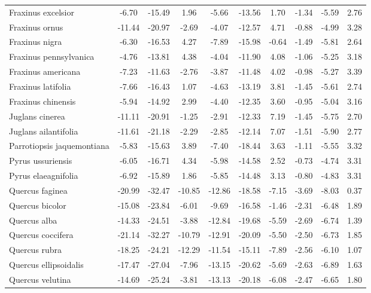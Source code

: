\documentclass[11pt]{article}
\begin{document}
\begin{longtable}{p{1.50in}c{0.32in}c{0.32in}c{0.32in}c{0.32in}c{0.32in}c{0.32in}c{0.2in}c{0.3in}c{0.1in}}
  Fraxinus excelsior & -6.70 & -15.49 & 1.96 & -5.66 & -13.56 & 1.70 & -1.34 & -5.59 & 2.76 \\ 
  Fraxinus ornus & -11.44 & -20.97 & -2.69 & -4.07 & -12.57 & 4.71 & -0.88 & -4.99 & 3.28 \\ 
  Fraxinus nigra & -6.30 & -16.53 & 4.27 & -7.89 & -15.98 & -0.64 & -1.49 & -5.81 & 2.64 \\ 
  Fraxinus pennsylvanica & -4.76 & -13.81 & 4.38 & -4.04 & -11.90 & 4.08 & -1.06 & -5.25 & 3.18 \\ 
  Fraxinus americana & -7.23 & -11.63 & -2.76 & -3.87 & -11.48 & 4.02 & -0.98 & -5.27 & 3.39 \\ 
  Fraxinus latifolia & -7.66 & -16.43 & 1.07 & -4.63 & -13.19 & 3.81 & -1.45 & -5.61 & 2.74 \\ 
  Fraxinus chinensis & -5.94 & -14.92 & 2.99 & -4.40 & -12.35 & 3.60 & -0.95 & -5.04 & 3.16 \\ 
  Juglans cinerea & -11.11 & -20.91 & -1.25 & -2.91 & -12.33 & 7.19 & -1.45 & -5.75 & 2.70 \\ 
  Juglans ailantifolia & -11.61 & -21.18 & -2.29 & -2.85 & -12.14 & 7.07 & -1.51 & -5.90 & 2.77 \\ 
  Parrotiopsis jaquemontiana & -5.83 & -15.63 & 3.89 & -7.40 & -18.44 & 3.63 & -1.11 & -5.55 & 3.32 \\ 
  Pyrus ussuriensis & -6.05 & -16.71 & 4.34 & -5.98 & -14.58 & 2.52 & -0.73 & -4.74 & 3.31 \\ 
  Pyrus elaeagnifolia & -6.92 & -15.89 & 1.86 & -5.85 & -14.48 & 3.13 & -0.80 & -4.83 & 3.31 \\ 
  Quercus faginea & -20.99 & -32.47 & -10.85 & -12.86 & -18.58 & -7.15 & -3.69 & -8.03 & 0.37 \\ 
  Quercus bicolor & -15.08 & -23.84 & -6.01 & -9.69 & -16.58 & -1.46 & -2.31 & -6.48 & 1.89 \\ 
  Quercus alba & -14.33 & -24.51 & -3.88 & -12.84 & -19.68 & -5.59 & -2.69 & -6.74 & 1.39 \\ 
  Quercus coccifera & -21.14 & -32.27 & -10.79 & -12.91 & -20.09 & -5.50 & -2.50 & -6.73 & 1.85 \\ 
  Quercus rubra & -18.25 & -24.21 & -12.29 & -11.54 & -15.11 & -7.89 & -2.56 & -6.10 & 1.07 \\ 
  Quercus ellipsoidalis & -17.47 & -27.04 & -7.96 & -13.15 & -20.62 & -5.69 & -2.63 & -6.89 & 1.63 \\ 
  Quercus velutina & -14.69 & -25.24 & -3.81 & -13.13 & -20.18 & -6.08 & -2.47 & -6.65 & 1.80 \\ 

\end{longtable}
\end{document}
